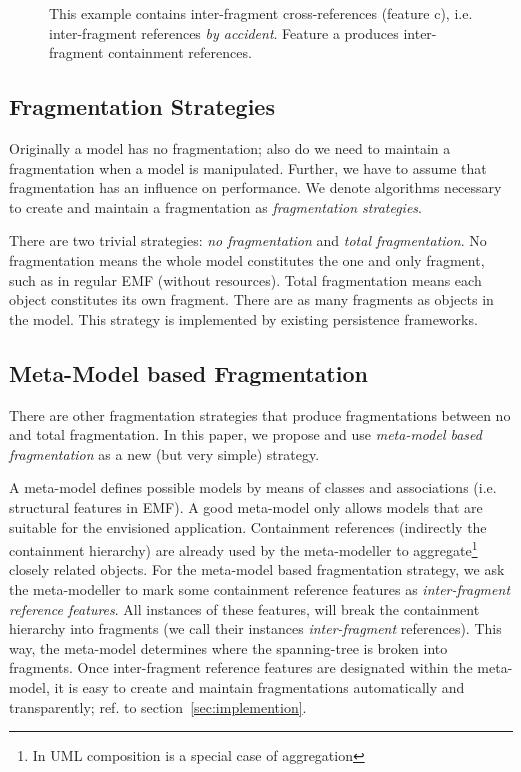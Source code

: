 \begin{figure}[ht]
\begin{minipage}[b]{0.5\linewidth}
\caption{This example contains inter-fragment cross-references (feature c), i.e. inter-fragment references \emph{by accident}. Feature a produces inter-fragment containment references.}
\label{fig:metamodel_fragmentation_pattern_graph}
\end{minipage}
\end{figure}  

\subsection{Fragmentation Strategies}

Originally a model has no fragmentation; also do we need to maintain a fragmentation when a model is manipulated. Further, we have to assume that fragmentation has an influence on performance. We denote algorithms necessary to create and maintain a fragmentation as \emph{fragmentation strategies}.

There are two trivial strategies: \emph{no fragmentation} and \emph{total fragmentation}. No fragmentation means the whole model constitutes the one and only fragment, such as in regular EMF (without resources). Total fragmentation means each object constitutes its own fragment. There are as many fragments as objects in the model. This strategy is implemented by existing persistence frameworks.

\subsection{Meta-Model based Fragmentation}

There are other fragmentation strategies that produce fragmentations between no and total fragmentation. In this paper, we propose and use \emph{meta-model based fragmentation} as a new (but very simple) strategy.

A meta-model defines possible models by means of classes and associations (i.e. structural features in EMF). A good meta-model only allows models that are suitable for the envisioned application. Containment references (indirectly the containment hierarchy) are already used by the meta-modeller to aggregate\footnote{In UML composition is a special case of aggregation} closely related objects. For the meta-model based fragmentation strategy, we ask the meta-modeller to mark some containment reference features as \emph{inter-fragment reference features}. All instances of these features, will break the containment hierarchy into fragments (we call their instances \emph{inter-fragment} references). This way, the meta-model determines where the spanning-tree is broken into fragments. 
Once inter-fragment reference features are designated within the meta-model, it is easy to create and maintain fragmentations automatically and transparently; ref. to section~\ref{sec:implemention}.

